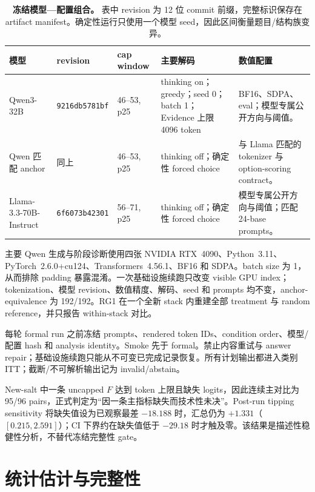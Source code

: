 \documentclass[UTF8,letterpaper,10pt,twocolumn]{ctexart}
\begin{document}
\begin{table}[t]
\centering
\scriptsize
\setlength{\tabcolsep}{3pt}
\renewcommand{\arraystretch}{1.12}
\begin{tabularx}{\textwidth}{@{}L{2.25cm}L{2.15cm}L{1.75cm}L{3.15cm}Y@{}}
\toprule
模型 & revision & cap window & 主要解码 & 数值配置 \\
\midrule
Qwen3-32B & \texttt{9216db5781bf} & 46--53, p25 & thinking on；greedy；seed 0；batch 1；Evidence 上限 4096 token & BF16、SDPA、eval；模型专属公开方向与阈值。 \\
Qwen 匹配 anchor & 同上 & 46--53, p25 & thinking off；确定性 forced choice & 与 Llama 匹配的 tokenizer 与 option-scoring contract。 \\
Llama-3.3-70B-Instruct & \texttt{6f6073b42301} & 56--71, p25 & thinking off；确定性 forced choice & 模型专属公开方向与阈值；匹配 24-base prompts。 \\
\bottomrule
\end{tabularx}
\caption{\textbf{冻结模型—配置组合。} 表中 revision 为 12 位 commit 前缀，完整标识保存在 artifact manifest。确定性运行只使用一个模型 seed，因此区间衡量题目/结构族变异。}
\label{tab:supp-models-zh}
\end{table}

主要 Qwen 生成与阶段诊断使用四张 NVIDIA RTX~4090、Python~3.11、PyTorch~2.6.0+cu124、Transformers~4.56.1、BF16 和 SDPA。batch size 为 1，从而排除 padding 暴露混淆。一次基础设施续跑只改变 visible GPU index；tokenization、模型 revision、数值精度、解码、seed 和 prompts 均不变，anchor-equivalence 为 192/192。RG1 在一个全新 stack 内重建全部 treatment 与 random reference，并只报告 within-stack 对比。

每轮 formal run 之前冻结 prompts、rendered token IDs、condition order、模型/配置 hash 和 analysis identity。Smoke 先于 formal。禁止内容重试与 answer repair；基础设施续跑只能从不可变已完成记录恢复。所有计划输出都进入类别 ITT；截断/不可解析输出记为 invalid/abstain。

New-salt 中一条 uncapped $F$ 达到 token 上限且缺失 logits，因此连续主对比为 95/96 pairs，正式判定为“因一条主指标缺失而技术性未决”。Post-run tipping sensitivity 将缺失值设为已观察最差 $-18.188$ 时，汇总仍为 $+1.331$（$[0.215,2.591]$）；CI 下界约在缺失值低于 $-29.18$ 时才触及零。该结果是描述性稳健性分析，不替代冻结完整性 gate。

\section{统计估计与完整性}
\label{supp:inference-zh}
\end{document}
